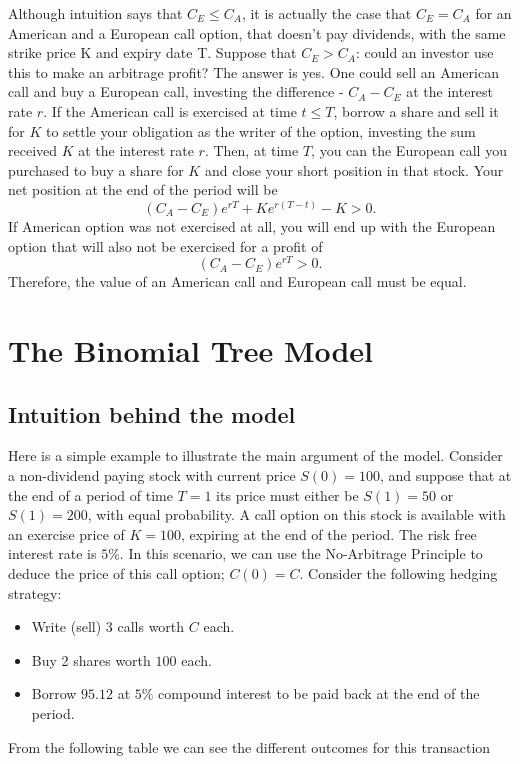 \documentclass[letterpaper,12pt]{article}
\theoremstyle{plain}
\numberwithin{equation}{section}
\begin{document}
Although intuition says that $C_E \leq C_A$, it is actually the case that $C_E = C_A$ for an American and a European call option, that doesn't pay dividends, with the same strike price K and expiry date T. Suppose that $C_E > C_A$: could an investor use this to make an arbitrage profit? The answer is yes. One could sell an American call and buy a European call, investing the difference - $C_A - C_E$ at the interest rate $r$. If the American call is exercised at time $t \leq T$, borrow a share and sell it for $K$ to settle your obligation as the writer of the option, investing the sum received $K$ at the interest rate $r$. Then, at time $T$, you can the European call you purchased to buy a share for $K$ and close your short position in that stock. Your net position at the end of the period will be
\begin{equation*}
	(C_A - C_E)e^{rT} + Ke^{r(T-t)}-K > 0.	
\end{equation*}
If American option was not exercised at all, you will end up with the European option that will also not be exercised for a profit of 
\begin{equation*}
 	(C_A - C_E)e^{rT} >0.
 \end{equation*}
Therefore, the value of an American call and European call must be equal.


\section{The Binomial Tree Model}
\subsection{Intuition behind the model}
Here is a simple example to illustrate the main argument of the model. Consider a non-dividend paying stock with current price $S(0) = 100$, and suppose that at the end of a period of time $T=1$ its price must either be $S(1) = 50$ or $S(1) = 200$, with equal probability. A call option on this stock is available with an exercise price of $K = 100$, expiring at the end of the period. The risk free interest rate is $5\%$. In this scenario, we can use the No-Arbitrage Principle to deduce the price of this call option; $C(0) = C$. Consider the following hedging strategy:
\begin{itemize}
	\item Write (sell) 3 calls worth $C$ each.
	\item Buy 2 shares worth $100$ each.
	\item Borrow $95.12$ at $5\%$ compound interest to be paid back at the end of the period.
\end{itemize}
From the following table we can see the different outcomes for this transaction
\end{document}

